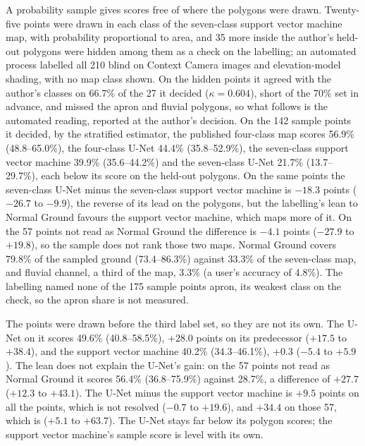 \documentclass[twocolumn]{aastex701}
\begin{document}
A probability sample \citep{Olofsson2014} gives scores free of where the polygons were drawn. Twenty-five points were
drawn in each class of the seven-class support vector machine map, with probability proportional to area, and 35
more inside the author's held-out polygons were hidden among them as a check on the labelling; an automated process
labelled all 210 blind on Context Camera images and elevation-model shading, with no map class shown. On the hidden
points it agreed with the author's classes on 66.7\% of the 27 it decided ($\kappa=0.604$), short of the 70\% set in
advance, and missed the apron and fluvial polygons, so what follows is the automated reading, reported at the
author's decision. On the 142 sample points it decided, by the stratified estimator, the published four-class map
scores 56.9\% (48.8--65.0\%), the four-class U-Net 44.4\% (35.8--52.9\%), the seven-class support vector machine
39.9\% (35.6--44.2\%) and the seven-class U-Net 21.7\% (13.7--29.7\%), each below its score on the held-out polygons.
On the same points the seven-class U-Net minus the seven-class support vector machine is $-18.3$ points ($-26.7$ to
$-9.9$), the reverse of its lead on the polygons, but the labelling's lean to Normal Ground favours the support vector
machine, which maps more of it. On the 57 points not read as Normal Ground the difference is $-4.1$ points ($-27.9$ to
$+19.8$), so the sample does not rank those two maps.
Normal Ground covers 79.8\% of the sampled ground (73.4--86.3\%) against 33.3\% of the seven-class map, and fluvial
channel, a third of the map, 3.3\% (a user's accuracy of 4.8\%). The labelling named none of the 175 sample points apron, its
weakest class on the check, so the apron share is not measured. %

The points were drawn before the third label set, so they are not its own. The U-Net on it scores 49.6\%
(40.8--58.5\%), $+28.0$ points on its predecessor ($+17.5$ to $+38.4$), and the support vector machine 40.2\%
(34.3--46.1\%), $+0.3$ ($-5.4$ to $+5.9$). The lean does not explain the U-Net's gain: on the 57 points not read as
Normal Ground it scores 56.4\% (36.8--75.9\%) against 28.7\%, a difference of $+27.7$ ($+12.3$ to $+43.1$). The U-Net
minus the support vector machine is $+9.5$ points on all the points, which is not resolved ($-0.7$ to $+19.6$), and $+34.4$
on those 57, which is ($+5.1$ to $+63.7$). The U-Net stays far below its polygon scores; the support vector machine's sample score is level with its own.
\end{document}
